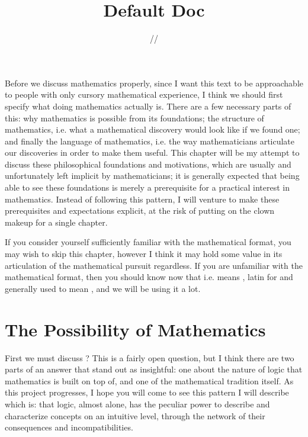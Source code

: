 \documentclass[11pt]{article}
\title{\textbf{Default Doc}}
\date{\the\day/\the\month/\the\year}
\begin{document}
Before we discuss mathematics properly, since I want this text to be approachable to people with only cursory mathematical experience, I think we should first specify what doing mathematics actually is. There are a few necessary parts of this: why mathematics is possible from its foundations; the structure of mathematics, i.e. what a mathematical discovery would look like if we found one; and finally the language of mathematics, i.e. the way mathematicians articulate our discoveries in order to make them useful. This chapter will be my attempt to discuss these philosophical foundations and motivations, which are usually and unfortunately left implicit by mathematicians; it is generally expected that being able to see these foundations is merely a prerequisite for a practical interest in mathematics. Instead of following this pattern, I will venture to make these prerequisites and expectations explicit, at the risk of putting on the clown makeup for a single chapter.

If you consider yourself sufficiently familiar with the mathematical format, you may wish to skip this chapter, however I think it may hold some value in its articulation of the mathematical pursuit regardless. If you are unfamiliar with the mathematical format, then you should know now that i.e. means , latin for  and generally used to mean , and we will be using it a lot.

\section{The Possibility of Mathematics}

First we must discuss ? This is a fairly open question, but I think there are two parts of an answer that stand out as insightful: one about the nature of logic that mathematics is built on top of, and one of the mathematical tradition itself. As this project progresses, I hope you will come to see this pattern I will describe which is: that logic, almost alone, has the peculiar power to describe and characterize concepts on an intuitive level, through the network of their consequences and incompatibilities.
\end{document}
